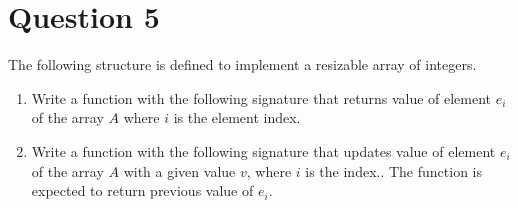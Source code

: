 \documentclass[12pt,letterpaper,twoside]{article}
\begin{document}
\newpage

\section*{Question 5}

The following structure is defined to implement a resizable array of integers.

\lstset{language=c,tabsize=4}


\begin{enumerate}
\item Write a function with the following signature that returns value of element $e_{i}$ of the array $A$ where $i$ is the element index.



\item Write a function with the following signature that updates value of element $e_{i}$ of the array $A$ with a given value $v$, where $i$ is the index..
The function is expected to return previous value of $e_{i}$.


\end{enumerate}
\end{document}
